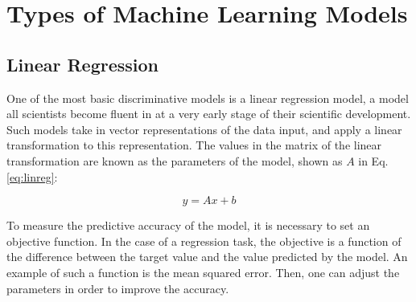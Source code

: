 \section{Types of Machine Learning Models}

\subsection{Linear Regression}

One of the most basic discriminative models is a linear regression model, a model all scientists become fluent in at a very early stage of their scientific development. Such models take in vector representations of the data input, and apply a linear transformation to this representation. The values in the matrix of the linear transformation are known as the parameters of the model, shown as $A$ in Eq. \eqref{eq:linreg}:

\begin{equation}\label{eq:linreg}
  y = Ax + b
\end{equation}

To measure the predictive accuracy of the model, it is necessary to set an objective function. In the case of a regression task, the objective is a function of the difference between the target value and the value predicted by the model. An example of such a function is the mean squared error. Then, one can adjust the parameters in order to improve the accuracy.

